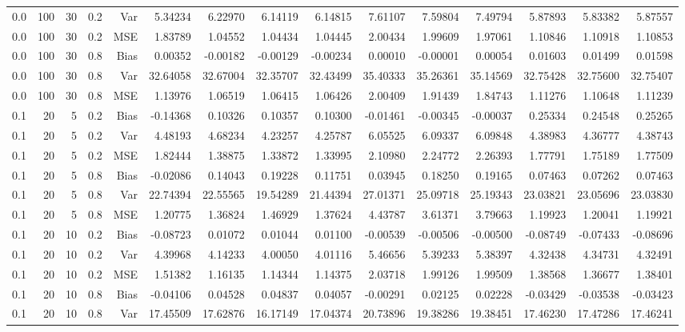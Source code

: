 \begin{table}[!htbp]
\begin{tabular}{lrrrrrrrrrrrrrr}
0.0 & 100 & 30 & 0.2 & Var & 5.34234 & 6.22970 & 6.14119 & 6.14815 & 7.61107 & 7.59804 & 7.49794 & 5.87893 & 5.83382 & 5.87557 \\
0.0 & 100 & 30 & 0.2 & MSE & 1.83789 & 1.04552 & 1.04434 & 1.04445 & 2.00434 & 1.99609 & 1.97061 & 1.10846 & 1.10918 & 1.10853 \\
0.0 & 100 & 30 & 0.8 & Bias & 0.00352 & -0.00182 & -0.00129 & -0.00234 & 0.00010 & -0.00001 & 0.00054 & 0.01603 & 0.01499 & 0.01598 \\
0.0 & 100 & 30 & 0.8 & Var & 32.64058 & 32.67004 & 32.35707 & 32.43499 & 35.40333 & 35.26361 & 35.14569 & 32.75428 & 32.75600 & 32.75407 \\
0.0 & 100 & 30 & 0.8 & MSE & 1.13976 & 1.06519 & 1.06415 & 1.06426 & 2.00409 & 1.91439 & 1.84743 & 1.11276 & 1.10648 & 1.11239 \\
0.1 &  20 &  5 & 0.2 & Bias & -0.14368 & 0.10326 & 0.10357 & 0.10300 & -0.01461 & -0.00345 & -0.00037 & 0.25334 & 0.24548 & 0.25265 \\
0.1 &  20 &  5 & 0.2 & Var & 4.48193 & 4.68234 & 4.23257 & 4.25787 & 6.05525 & 6.09337 & 6.09848 & 4.38983 & 4.36777 & 4.38743 \\
0.1 &  20 &  5 & 0.2 & MSE & 1.82444 & 1.38875 & 1.33872 & 1.33995 & 2.10980 & 2.24772 & 2.26393 & 1.77791 & 1.75189 & 1.77509 \\
0.1 &  20 &  5 & 0.8 & Bias & -0.02086 & 0.14043 & 0.19228 & 0.11751 & 0.03945 & 0.18250 & 0.19165 & 0.07463 & 0.07262 & 0.07463 \\
0.1 &  20 &  5 & 0.8 & Var & 22.74394 & 22.55565 & 19.54289 & 21.44394 & 27.01371 & 25.09718 & 25.19343 & 23.03821 & 23.05696 & 23.03830 \\
0.1 &  20 &  5 & 0.8 & MSE & 1.20775 & 1.36824 & 1.46929 & 1.37624 & 4.43787 & 3.61371 & 3.79663 & 1.19923 & 1.20041 & 1.19921 \\
0.1 &  20 & 10 & 0.2 & Bias & -0.08723 & 0.01072 & 0.01044 & 0.01100 & -0.00539 & -0.00506 & -0.00500 & -0.08749 & -0.07433 & -0.08696 \\
0.1 &  20 & 10 & 0.2 & Var & 4.39968 & 4.14233 & 4.00050 & 4.01116 & 5.46656 & 5.39233 & 5.38397 & 4.32438 & 4.34731 & 4.32491 \\
0.1 &  20 & 10 & 0.2 & MSE & 1.51382 & 1.16135 & 1.14344 & 1.14375 & 2.03718 & 1.99126 & 1.99509 & 1.38568 & 1.36677 & 1.38401 \\
0.1 &  20 & 10 & 0.8 & Bias & -0.04106 & 0.04528 & 0.04837 & 0.04057 & -0.00291 & 0.02125 & 0.02228 & -0.03429 & -0.03538 & -0.03423 \\
0.1 &  20 & 10 & 0.8 & Var & 17.45509 & 17.62876 & 16.17149 & 17.04374 & 20.73896 & 19.38286 & 19.38451 & 17.46230 & 17.47286 & 17.46241 \\

\end{tabular}
\end{table}
